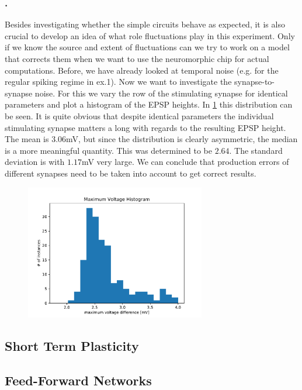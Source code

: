 \documentclass[10pt,a4paper]{article}
\begin{document}
\subsubsection{.}
Besides investigating whether the simple circuits behave as expected, it is also
crucial to develop an idea of what role fluctuations play in this experiment.  Only
if we know the source and extent of fluctuations can we try to work on a model
that corrects them when we want to use the neuromorphic chip for actual
computations.  Before,  we have already looked at temporal noise (e.g. for the
regular spiking regime in ex.1).  Now we want to investigate the synapse-to-synapse
noise.  For this we vary the row of the stimulating synapse for identical
parameters and plot a histogram of the EPSP heights.  In \ref{MaxVoltHisto} this
distribution can be seen.  It is quite obvious that despite identical parameters
the individual stimulating synapse matters a long with regards to the resulting
EPSP height.  The mean is $3.06$mV,  but since the distribution is clearly
asymmetric,  the median is a more meaningful quantity.  This was determined
to be $2.64$.  The standard deviation is with $1.17$mV very large.  We can
conclude that production errors of different synapses need to be taken into
account to get correct results.
\begin{figure}
		\includegraphics[width=0.7\textwidth]{figures/histo_maxVolt.pdf}
		\label{MaxVoltHisto}
	\end{figure}
\subsection{Short Term Plasticity}

\subsection{Feed-Forward Networks}
\end{document}
